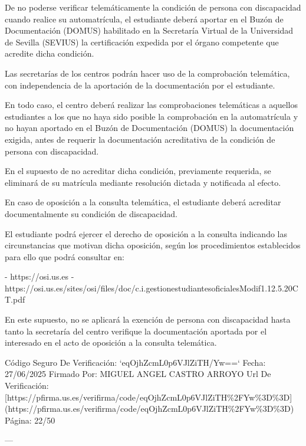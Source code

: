 \documentclass{article}
\begin{document}
\begin{itemize}
\begin{itemize}
\begin{scriptsize}
                  De no poderse verificar telemáticamente la condición de persona con discapacidad cuando realice su automatrícula, el estudiante deberá aportar en el Buzón de Documentación (DOMUS) habilitado en la Secretaría Virtual de la Universidad de Sevilla (SEVIUS) la certificación expedida por el órgano competente que acredite dicha condición.

                  Las secretarías de los centros podrán hacer uso de la comprobación telemática, con independencia de la aportación de la documentación por el estudiante.

                  En todo caso, el centro deberá realizar las comprobaciones telemáticas a aquellos estudiantes a los que no haya sido posible la comprobación en la automatrícula y no hayan aportado en el Buzón de Documentación (DOMUS) la documentación exigida, antes de requerir la documentación acreditativa de la condición de persona con discapacidad.

                  En el supuesto de no acreditar dicha condición, previamente requerida, se eliminará de su matrícula mediante resolución dictada y notificada al efecto.

                  En caso de oposición a la consulta telemática, el estudiante deberá acreditar documentalmente su condición de discapacidad.

                  El estudiante podrá ejercer el derecho de oposición a la consulta indicando las circunstancias que motivan dicha oposición, según los procedimientos establecidos para ello que podrá consultar en:

                  - https://osi.us.es
                  - https://osi.us.es/sites/osi/files/doc/c.i.gestionestudiantesoficialesModif1.12.5.20CT.pdf

                  En este supuesto, no se aplicará la exención de persona con discapacidad hasta tanto la secretaría del centro verifique la documentación aportada por el interesado en el acto de oposición a la consulta telemática.

                  Código Seguro De Verificación: `eqOjhZcmL0p6VJlZiTH/Yw==`
                  Fecha: 27/06/2025
                  Firmado Por: MIGUEL ANGEL CASTRO ARROYO
                  Url De Verificación: [https://pfirma.us.es/verifirma/code/eqOjhZcmL0p6VJlZiTH\%2FYw\%3D\%3D](https://pfirma.us.es/verifirma/code/eqOjhZcmL0p6VJlZiTH\%2FYw\%3D\%3D)
                  Página: 22/50

                  ---


\end{scriptsize}
\end{itemize}
\end{itemize}
\end{document}
